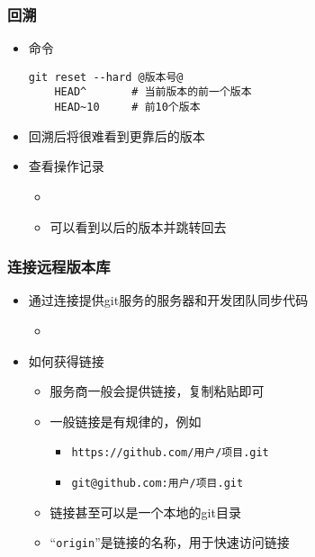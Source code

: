 \begin{frame} [fragile]
	\frametitle{回溯}
	\linespread{1.25}
	\begin{itemize}
	\item 命令
	\begin{lstlisting}[style=bashstyle, gobble=4, texcl, escapechar=@]
	git reset --hard @版本号@
	HEAD^		# 当前版本的前一个版本
	HEAD~10		# 前10个版本
	\end{lstlisting}
	\item 回溯后将很难看到更靠后的版本
	\item 查看操作记录
		\begin{itemize}
		\item {}
		\item 可以看到以后的版本并跳转回去
		\end{itemize}
	\end{itemize}
\end{frame}

\begin{frame} [fragile]
	\frametitle{连接远程版本库}
	\linespread{1.5}
	\begin{itemize}
	\item 通过连接提供git服务的服务器和开发团队同步代码
		\begin{itemize}
		\item {}
		\end{itemize}
	\item 如何获得链接
		\begin{itemize}
		\item 服务商一般会提供链接，复制粘贴即可
		\item 一般链接是有规律的，例如
			\begin{itemize}
			\item \texttt{https://github.com/用户/项目.git}
			\item \texttt{git@github.com:用户/项目.git}
			\end{itemize}
		\item 链接甚至可以是一个本地的git目录
		\item ``\texttt{origin}''是链接的名称，用于快速访问链接
		\end{itemize}
	\end{itemize}
\end{frame}

